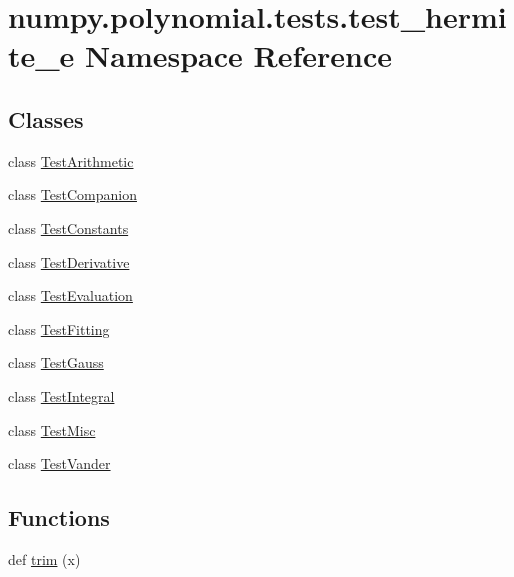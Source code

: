 \hypertarget{namespacenumpy_1_1polynomial_1_1tests_1_1test__hermite__e}{}\section{numpy.\+polynomial.\+tests.\+test\+\_\+hermite\+\_\+e Namespace Reference}
\label{namespacenumpy_1_1polynomial_1_1tests_1_1test__hermite__e}
\subsection*{Classes}
\begin{DoxyCompactItemize}
\item 
class \hyperlink{classnumpy_1_1polynomial_1_1tests_1_1test__hermite__e_1_1TestArithmetic}{Test\+Arithmetic}
\item 
class \hyperlink{classnumpy_1_1polynomial_1_1tests_1_1test__hermite__e_1_1TestCompanion}{Test\+Companion}
\item 
class \hyperlink{classnumpy_1_1polynomial_1_1tests_1_1test__hermite__e_1_1TestConstants}{Test\+Constants}
\item 
class \hyperlink{classnumpy_1_1polynomial_1_1tests_1_1test__hermite__e_1_1TestDerivative}{Test\+Derivative}
\item 
class \hyperlink{classnumpy_1_1polynomial_1_1tests_1_1test__hermite__e_1_1TestEvaluation}{Test\+Evaluation}
\item 
class \hyperlink{classnumpy_1_1polynomial_1_1tests_1_1test__hermite__e_1_1TestFitting}{Test\+Fitting}
\item 
class \hyperlink{classnumpy_1_1polynomial_1_1tests_1_1test__hermite__e_1_1TestGauss}{Test\+Gauss}
\item 
class \hyperlink{classnumpy_1_1polynomial_1_1tests_1_1test__hermite__e_1_1TestIntegral}{Test\+Integral}
\item 
class \hyperlink{classnumpy_1_1polynomial_1_1tests_1_1test__hermite__e_1_1TestMisc}{Test\+Misc}
\item 
class \hyperlink{classnumpy_1_1polynomial_1_1tests_1_1test__hermite__e_1_1TestVander}{Test\+Vander}
\end{DoxyCompactItemize}
\subsection*{Functions}
\begin{DoxyCompactItemize}
\item 
def \hyperlink{namespacenumpy_1_1polynomial_1_1tests_1_1test__hermite__e_a11abd08f0595283335acb253ec05ca19}{trim} (x)
\end{DoxyCompactItemize}
